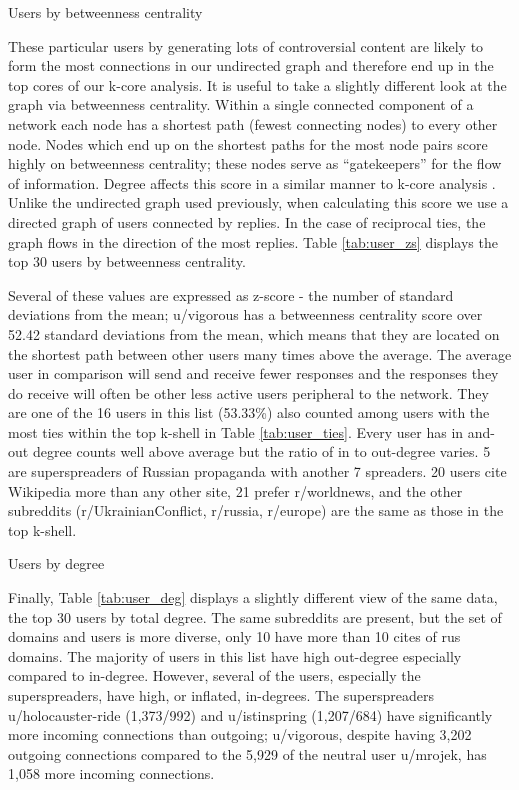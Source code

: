 \begin{table}[!ht]

\centering
\caption{Users by betweenness centrality}

\label{tab:user_zs}
\end{table}

These particular users by generating lots of controversial content are likely to form the most connections in our undirected graph and therefore end up in the top cores of our k-core analysis.
It is useful to take a slightly different look at the graph via betweenness centrality.
Within a single connected component of a network each node has a shortest path (fewest connecting nodes) to every other node.
Nodes which end up on the shortest paths for the most node pairs score highly on betweenness centrality; these nodes serve as ``gatekeepers'' for the flow of information.
Degree affects this score in a similar manner to k-core analysis \cite[p. 201]{woolley2018}. 
Unlike the undirected graph used previously, when calculating this score we use a directed graph of users connected by replies.
In the case of reciprocal ties, the graph flows in the direction of the most replies.
Table \ref{tab:user_zs} displays the top 30 users by betweenness centrality.

Several of these values are expressed as z-score - the number of standard deviations from the mean; u/vigorous has a betweenness centrality score over 52.42 standard deviations from the mean, which means that they are located on the shortest path between other users many times above the average.
The average user in comparison will send and receive fewer responses and the responses they do receive will often be other less active users peripheral to the network.
They are one of the 16 users in this list (53.33\%) also counted among users with the most ties within the top k-shell in Table \ref{tab:user_ties}.
Every user has in and-out degree counts well above average but the ratio of in to out-degree varies.
5 are superspreaders of Russian propaganda with another 7 spreaders.
20 users cite Wikipedia more than any other site, 21 prefer r/worldnews, and the other subreddits (r/UkrainianConflict, r/russia, r/europe) are the same as those in the top k-shell.

\begin{table}[!ht]

\centering
\caption{Users by degree}

\label{tab:user_deg}
\end{table}

Finally, Table \ref{tab:user_deg} displays a slightly different view of the same data, the top 30 users by total degree.
The same subreddits are present, but the set of domains and users is more diverse, only 10 have more than 10 cites of rus domains.
The majority of users in this list have high out-degree especially compared to in-degree.
However, several of the users, especially the superspreaders, have high, or inflated, in-degrees. 
The superspreaders u/holocauster-ride (1,373/992) and u/istinspring (1,207/684) have significantly more incoming connections than outgoing; u/vigorous, despite having 3,202 outgoing connections compared to the 5,929 of the neutral user u/mrojek, has 1,058 more incoming connections.

